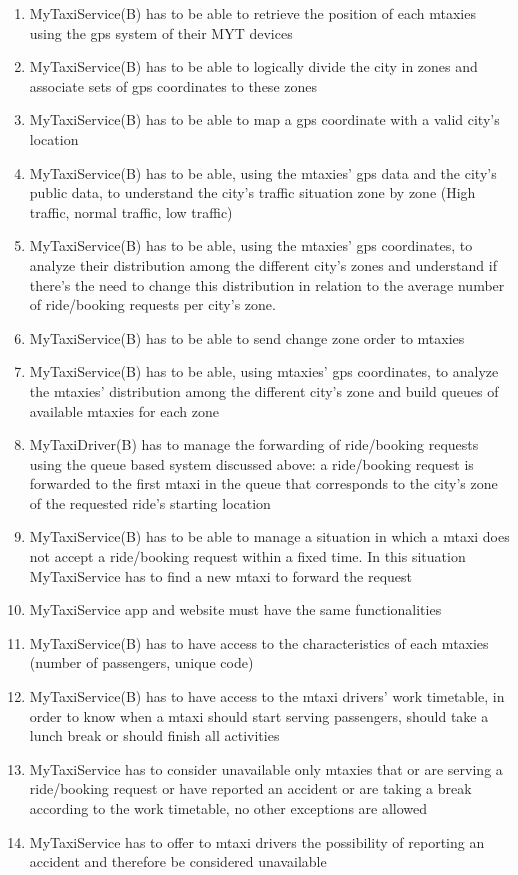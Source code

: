 \documentclass[11pt]{article} %
\begin{document}
\begin{enumerate}
	      \item MyTaxiService(B) has to be able to retrieve the position of each mtaxies using the gps system of their MYT devices
	      \item MyTaxiService(B) has to be able to logically divide the city in zones and associate sets of gps
	      coordinates to these zones
	      \item MyTaxiService(B) has to be able to map a gps coordinate with a valid city's location
	      \item MyTaxiService(B) has to be able, using the mtaxies' gps data and the city's public data, to understand the
	      city's traffic situation zone by zone (High traffic, normal traffic, low traffic)
	      \item MyTaxiService(B) has to be able, using the mtaxies' gps coordinates, to analyze their
	      distribution among the different city's zones and understand if there's the need to change this
	      distribution in relation to the average number of ride/booking requests per city's zone.
	      \item MyTaxiService(B) has to be able to send change zone order to mtaxies
	      \item MyTaxiService(B) has to be able, using mtaxies' gps coordinates, to analyze the mtaxies'
	      distribution among the different city's zone and build queues of available mtaxies for each zone
	      \item MyTaxiDriver(B) has to manage the forwarding of ride/booking requests using the queue based system discussed above:
	      a ride/booking request is forwarded to the first mtaxi in the queue that corresponds to the city's zone of the requested ride's
	      starting location
	      \item MyTaxiService(B) has to be able to manage a situation in which a mtaxi does not accept a ride/booking request within a fixed time.
	      In this situation MyTaxiService has to find a new mtaxi to forward the request
	      \item MyTaxiService app and website must have the same functionalities
	      \item MyTaxiService(B) has to have access to the characteristics of each mtaxies (number of passengers, unique code)
	      \item MyTaxiService(B) has to have access to the mtaxi drivers' work timetable, in order to know when a mtaxi should start
	      serving passengers, should take a lunch break or should finish all activities
	      \item MyTaxiService has to consider unavailable only mtaxies that or are serving a ride/booking request or have reported an accident or
	      are taking a break according to the work timetable, no other exceptions are allowed
	      \item MyTaxiService has to offer to mtaxi drivers the possibility of reporting an accident and therefore be considered unavailable
	\end{enumerate}
\end{document}
